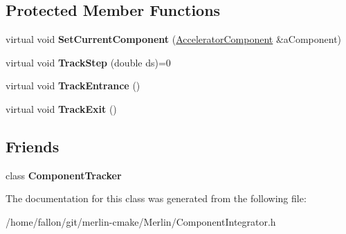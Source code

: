 \subsection*{Protected Member Functions}
\begin{DoxyCompactItemize}
\item 
\mbox{\label{classComponentIntegrator_a297f809c321275632fee9d8ff5888a1c}} 
virtual void {\bfseries Set\+Current\+Component} (\hyperlink{classAcceleratorComponent}{Accelerator\+Component} \&a\+Component)
\item 
\mbox{\label{classComponentIntegrator_aa9f0b7d4e71dee27739cd88fbf964e15}} 
virtual void {\bfseries Track\+Step} (double ds)=0
\item 
\mbox{\label{classComponentIntegrator_aedbb23def430ead6302118934b54cafd}} 
virtual void {\bfseries Track\+Entrance} ()
\item 
\mbox{\label{classComponentIntegrator_aca649a742f2355d7cbe0aa2297253d75}} 
virtual void {\bfseries Track\+Exit} ()
\end{DoxyCompactItemize}
\subsection*{Friends}
\begin{DoxyCompactItemize}
\item 
\mbox{\label{classComponentIntegrator_a47ec22f8d261031cdb117f49bfa14c59}} 
class {\bfseries Component\+Tracker}
\end{DoxyCompactItemize}


The documentation for this class was generated from the following file\+:\begin{DoxyCompactItemize}
\item 
/home/fallon/git/merlin-\/cmake/\+Merlin/Component\+Integrator.\+h\end{DoxyCompactItemize}

